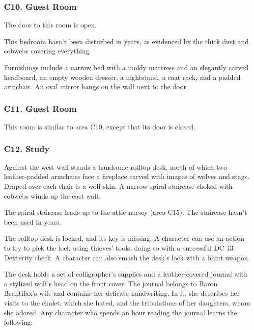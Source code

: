 \documentclass[10pt,a4paper,twoside,bg=print,twocolumn,openany,nodeprecatedcode]{dndbook}
\begin{document}
\subsubsection{C10. Guest Room}
The door to this room is open.

\begin{DndReadAloud}{}
This bedroom hasn't been disturbed in years, as evidenced by the thick dust and cobwebs covering everything. 

\end{DndReadAloud}

Furnishings include a narrow bed with a moldy mattress and an elegantly carved headboard, an empty wooden dresser, a nightstand, a coat rack, and a padded armchair. An oval mirror hangs on the wall next to the door.

\subsubsection{C11. Guest Room}
This room is similar to area C10, except that its door is closed.

\subsubsection{C12. Study}
\begin{DndReadAloud}{}
Against the west wall stands a handsome rolltop desk, north of which two leather-padded armchairs face a fireplace carved with images of wolves and stags. Draped over each chair is a wolf skin. A narrow spiral staircase choked with cobwebs winds up the east wall. 

\end{DndReadAloud}

The spiral staircase leads up to the attic nursey (area C15). The staircase hasn't been used in years.

The rolltop desk is locked, and its key is missing. A character can use an action to try to pick the lock using thieves' tools, doing so with a successful DC 13 Dexterity check. A character can also smash the desk's lock with a blunt weapon.

The desk holds a set of calligrapher's supplies and a leather-covered journal with a stylized wolf's head on the front cover. The journal belongs to Baron Brantifax's wife and contains her delicate handwriting. In it, she describes her visits to the chalet, which she hated, and the tribulations of her daughters, whom she adored. Any character who spends an hour reading the journal learns the following:
\end{document}

